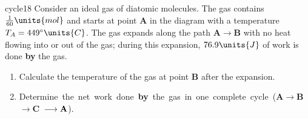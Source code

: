 \begin{problem}{3.0}{cycle}{18}
Consider an ideal gas of diatomic molecules.  The gas contains 
$\frac{1}{60} \units{mol}$ and starts at point {\bf A} in the diagram
with a temperature $T_A = 449^\circ\units{C}$.   The gas expands 
along the path {\bf A}$\longrightarrow${\bf B} with no heat flowing into 
or out of the gas; during this expansion, $76.9\units{J}$ of work is done 
{\bf by} the gas. 
\begin{enumerate}
\item Calculate the temperature of the gas at point {\bf B} after 
the expansion.
\item \mbox{Determine the net work done {\bf by} the gas in one complete cycle 
({\bf A}$\longrightarrow${\bf B}$\longrightarrow${\bf C}
$\longrightarrow{\bf A}$)}.
\end{enumerate}
\end{problem}
